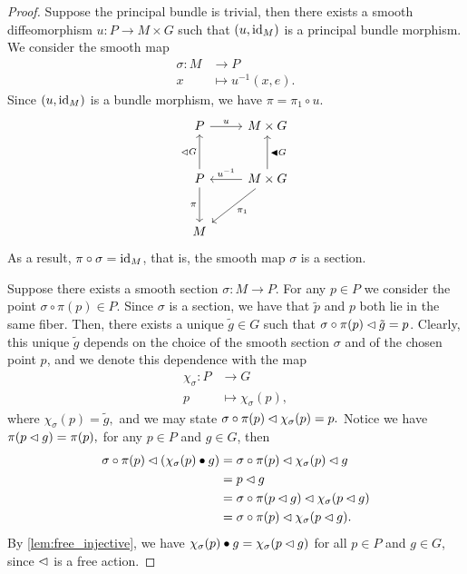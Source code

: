 \begin{proof}
    Suppose the principal bundle is trivial, then there exists a smooth diffeomorphism \(u : P \to M \times G\) such that \((u, \operatorname{id}_{M})\) is a principal bundle morphism. We consider the smooth map
    \begin{align*}
        \sigma : M &\to P\\
                 x &\mapsto u^{-1}(x, e).
    \end{align*}
    Since \((u, \operatorname{id}_{M})\) is a bundle morphism, we have \(\pi = \pi_1 \circ u\).
    \begin{equation*}
        \begin{tikzcd}[column sep = normal, row sep = large]
            P \arrow{r}{u} &M\times G\\
            P \arrow{u}{\ract G} \arrow[swap]{d}{\pi} & M \times G \arrow[swap]{u}{\ractalt G}\arrow[swap]{l}{u^{-1}} \arrow{ld}{\pi_1}\\
            M
        \end{tikzcd}
    \end{equation*}
    As a result, \(\pi \circ \sigma = \operatorname{id}_{M}\), that is, the smooth map \(\sigma\) is a section.

    Suppose there exists a smooth section \(\sigma : M \to P\). For any \(p \in P\) we consider the point \(\sigma \circ \pi(p) \in P\). Since \(\sigma\) is a section, we have that \(\tilde{p}\) and \(p\) both lie in the same fiber. Then, there exists a unique \(\tilde{g} \in G\) such that \(\sigma \circ \pi (p) \mathbin{\vartriangleleft} \tilde{g} = p\). Clearly, this unique \(\tilde{g}\) depends on the choice of the smooth section \(\sigma\) and of the chosen point \(p\), and we denote this dependence with the map
    \begin{align*}
        \chi_\sigma : P &\to G\\
                      p &\mapsto \chi_\sigma(p),
    \end{align*}
    where \(\chi_\sigma(p) = \tilde{g},\) and we may state \(\sigma \circ \pi (p) \mathbin{\vartriangleleft} \chi_\sigma(p) = p.\) Notice we have \(\pi(p \mathbin{\vartriangleleft} g) = \pi(p),\) for any \(p \in P\) and \(g \in G\), then
    \begin{align*}
        \sigma \circ \pi (p) \mathbin{\vartriangleleft} (\chi_\sigma(p) \bullet g)  &=\sigma \circ \pi (p) \mathbin{\vartriangleleft} \chi_\sigma(p) \mathbin{\vartriangleleft} g   \\
                                                               &= p \mathbin{\vartriangleleft} g\\
                                                               &= \sigma \circ \pi (p \mathbin{\vartriangleleft} g) \mathbin{\vartriangleleft} \chi_\sigma(p \mathbin{\vartriangleleft} g) \\
                                                               &= \sigma \circ \pi (p) \mathbin{\vartriangleleft} \chi_\sigma(p \mathbin{\vartriangleleft} g).
    \end{align*}
    By \cref{lem:free_injective}, we have \(\chi_\sigma(p) \bullet g = \chi_\sigma(p \mathbin{\vartriangleleft} g)\) for all \(p \in P\) and \(g \in G\), since \(\mathbin{\vartriangleleft}\) is a free action.


\end{proof}
